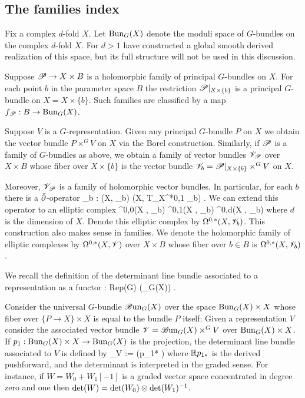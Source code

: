 \subsection{The families index}

Fix a complex $d$-fold $X$. 
Let ${\rm Bun}_{G}(X)$ denote the moduli space of $G$-bundles on the complex $d$-fold $X$. 
For $d > 1$ \cite{FHK} have constructed a global smooth derived realization of this space, but its full structure will not be used in this discussion. 

Suppose $\mathscr P \to X \times B$ is a holomorphic family of principal $G$-bundles on $X$. 
For each point $b$ in the parameter space $B$ the restriction $\mathscr P|_{X \times \{b\}}$ is a principal $G$-bundle on $X = X \times \{b\}$. 
Such families are classified by a map $f_{\mathscr P} : B \to {\rm Bun}_G(X)$.

Suppose $V$ is a $G$-representation. 
Given any principal $G$-bundle $P$ on $X$ we obtain the vector bundle $P \times^G V$ on $X$ via the Borel construction. 
Similarly, if $\mathscr P$ is a family of $G$-bundles as above, we obtain a family of vector bundles $\mathscr V_\mathscr P$ over $X \times B$ whose fiber over $X \times \{b\}$ is the vector bundle $\mathscr V_b = \mathscr P|_{X \times \{b\}} \times^G V$ on $X$.

Moreover, $\mathscr V_\mathscr P$ is a family of holomorphic vector bundles. 
In particular, for each $b$ there is a $\Bar{\partial}$-operator
\ben
\dbar_b : \Gamma(X, \sV_b) \to \Gamma(X, T_X^{*0,1} \tensor \sV_b) .
\een
We can extend this operator to an elliptic complex 
\ben
\Omega^{0,0}(X , \sV_b)  \Omega^{0,1}(X , \sV_b)  \cdots {} \Omega^{0,d}(X , \sV_b)
\een
where $d$ is the dimension of $X$. 
Denote this elliptic complex by $\Omega^{0,*}(X , \mathscr V_b)$. 
This construction also makes sense in families.
We denote the holomorphic family of elliptic complexes by $\Omega^{0,*}(X , \mathscr V)$ over $X \times B$ whose fiber over $b \in B$ is $\Omega^{0,*}(X , \mathscr V_b)$.

We recall the definition of the determinant line bundle associated to a representation as a functor
\ben
\kappa : {\rm Rep}(G) (\Bun_G(X)) .
\een

Consider the universal $G$-bundle $\mathscr B {\rm un}_G(X)$ over the space ${\rm Bun}_G(X) \times X$ whose fiber over $\{P \to X\} \times X$ is equal to the bundle $P$ itself:
\ben
{}
\een
Given a representation $V$ consider the associated vector bundle $\mathscr V = \mathscr B {\rm un}_G(X) \times^G V$ over ${\rm Bun}_G(X) \times X$. 
If $p_1 : {\rm Bun}_G(X) \times X \to {\rm Bun}_G(X)$ is the projection, the determinant line bundle associated to $V$ is defined by
\ben
\kappa_V := \det (\RR p_{1*} \sV)
\een
where $\mathbb R p_{1*}$ is the derived pushforward, and the determinant is interpreted in the graded sense.
For instance, if $W = W_0 + W_1 [-1]$ is a graded vector space concentrated in degree zero and one then $\det(W) = \det(W_0) \otimes \det(W_1)^{-1}$.

